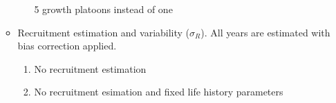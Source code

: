 \documentclass[11pt,
  english,
  a4paper,
]{article}
\begin{document}
\begin{itemize}
\begin{itemize}
\begin{enumerate}


      5 growth platoons instead of one

      \tagmcend\tagstructend\tagstructend

      \tagmcend\tagstructend\tagstructend

      \tagmcend\tagstructend\tagstructend
    \end{enumerate}

    \tagstructend
  \item


    Recruitment estimation and variability ({\(\sigma_R\)\leavevmode\tagmcend\tagstructend}). All years are estimated with bias correction applied.

    \tagmcend\tagstructend\tagstructend

    \tagmcend\tagstructend\tagstructend


    \begin{enumerate}
    \def\labelenumi{\arabic{enumi}.}
    \setcounter{enumi}{11}
    \item



      No recruitment estimation

      \tagmcend\tagstructend\tagstructend

      \tagmcend\tagstructend\tagstructend

      \tagmcend\tagstructend\tagstructend
    \item



      No recruitment esimation and fixed life history parameters


\end{enumerate}
\end{itemize}
\end{itemize}
\end{document}

